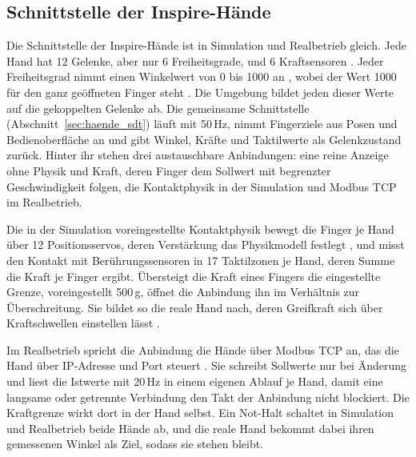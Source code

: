 \subsection{Schnittstelle der Inspire-Hände}
\label{sec:hand_schnittstelle}
Die Schnittstelle der Inspire-Hände ist in Simulation und Realbetrieb gleich.
Jede Hand hat 12 Gelenke, aber nur 6 Freiheitsgrade, und 6 Kraftsensoren \cite{Inspire2024}.
Jeder Freiheitsgrad nimmt einen Winkelwert von 0 bis 1000 an \cite{Inspire2024}, wobei der Wert 1000 für den ganz geöffneten Finger steht \cite{Inspire2024}.
Die Umgebung bildet jeden dieser Werte auf die gekoppelten Gelenke ab.
Die gemeinsame Schnittstelle (Abschnitt~\ref{sec:haende_sdt}) läuft mit 50\,Hz, nimmt Fingerziele aus Posen und Bedienoberfläche an und gibt Winkel, Kräfte und Taktilwerte als Gelenkzustand zurück.
Hinter ihr stehen drei austauschbare Anbindungen: eine reine Anzeige ohne Physik und Kraft, deren Finger dem Sollwert mit begrenzter Geschwindigkeit folgen, die Kontaktphysik in der Simulation und Modbus TCP im Realbetrieb.

Die in der Simulation voreingestellte Kontaktphysik bewegt die Finger je Hand über 12 Positionsservos, deren Verstärkung das Physikmodell festlegt \cite{MujocoDoku2026b}, und misst den Kontakt mit Berührungssensoren \cite{MujocoDoku2026a} in 17 Taktilzonen je Hand, deren Summe die Kraft je Finger ergibt.
Übersteigt die Kraft eines Fingers die eingestellte Grenze, voreingestellt 500\,g, öffnet die Anbindung ihn im Verhältnis zur Überschreitung.
Sie bildet so die reale Hand nach, deren Greifkraft sich über Kraftschwellen einstellen lässt \cite{Inspire2024}.

Im Realbetrieb spricht die Anbindung die Hände über Modbus TCP an, das die Hand über IP-Adresse und Port steuert \cite{Inspire2024}.
Sie schreibt Sollwerte nur bei Änderung und liest die Istwerte mit 20\,Hz in einem eigenen Ablauf je Hand, damit eine langsame oder getrennte Verbindung den Takt der Anbindung nicht blockiert.
Die Kraftgrenze wirkt dort in der Hand selbst.
Ein Not-Halt schaltet in Simulation und Realbetrieb beide Hände ab, und die reale Hand bekommt dabei ihren gemessenen Winkel als Ziel, sodass sie stehen bleibt.

